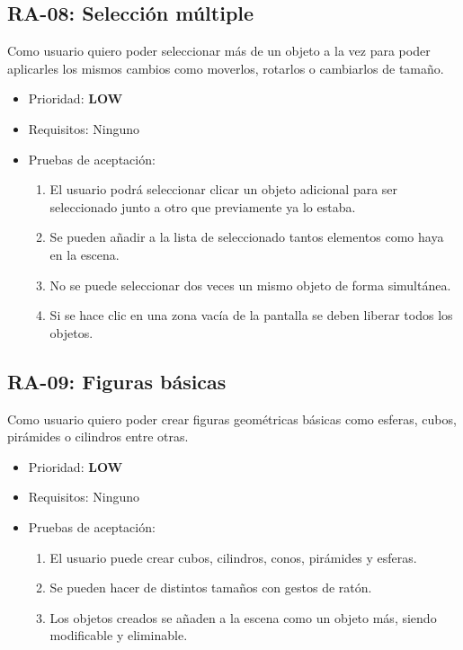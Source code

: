\subsection{RA-08: Selección múltiple}
Como usuario quiero poder seleccionar más de un objeto a la vez para poder aplicarles los mismos cambios como moverlos, rotarlos o cambiarlos de tamaño.

\begin{itemize}
    \item Prioridad: \textbf{LOW}
    \item Requisitos: Ninguno
    \item Pruebas de aceptación:
	\begin{enumerate}
		\item El usuario podrá seleccionar clicar un objeto adicional para ser seleccionado junto a otro que previamente ya lo estaba.
		\item Se pueden añadir a la lista de seleccionado tantos elementos como haya en la escena.
		\item No se puede seleccionar dos veces un mismo objeto de forma simultánea.
		\item Si se hace clic en una zona vacía de la pantalla se deben liberar todos los objetos.
	\end{enumerate}
\end{itemize}

\subsection{RA-09: Figuras básicas}
Como usuario quiero poder crear figuras geométricas básicas como esferas, cubos, pirámides o cilindros entre otras.

\begin{itemize}
    \item Prioridad: \textbf{LOW}
    \item Requisitos: Ninguno
    \item Pruebas de aceptación:
	\begin{enumerate}
		\item El usuario puede crear cubos, cilindros, conos, pirámides y esferas.
		\item Se pueden hacer de distintos tamaños con gestos de ratón.
		\item Los objetos creados se añaden a la escena como un objeto más, siendo modificable y eliminable.
	\end{enumerate}
\end{itemize}

